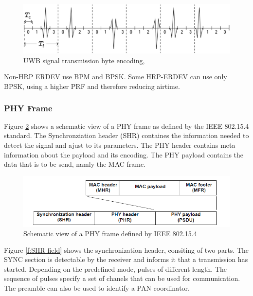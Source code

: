 \begin{figure}[ht!]
	\centering
	\includegraphics[width=\linewidth]{graphics/uwb_signal_tramsmission.png}
	\caption{UWB signal transmission byte encoding, \cite{QorvoGettingBacktoBasics}}
	\label{f:UWB_signal_description}
\end{figure}

Non-HRP ERDEV use BPM and BPSK.
Some HRP-ERDEV can use only BPSK, using a higher PRF and therefore reducing airtime.








\subsubsection{PHY Frame}
Figure \ref{f:PPDU general} shows a schematic view of a PHY frame as defined by the IEEE 802.15.4 standard.
The Synchronziation header (SHR) containes the information needed to detect the signal and ajust to its parameters.
The PHY header contains meta information about the payload and its encoding.
The PHY payload contains the data that is to be send, namly the MAC frame.

\begin{figure}[!ht]
\centering
\includegraphics[width=\linewidth]{graphics/Schematic_view_PPDU.png}
\caption{Schematic view of a PHY frame defined by IEEE 802.15.4 \cite{IEEE4-2020-7}}
\label{f:PPDU general}
\end{figure}


Figure \ref{f:SHR field} shows the synchronization header, consiting of two parts.
The SYNC section is detectable by the receiver and informs it that a transmission has started.
Depending on the predefined mode, pulses of different length.
The sequence of pulses specify a set of chanels that can be used for communication.
The preamble can also be used to identify a PAN coordinator.

